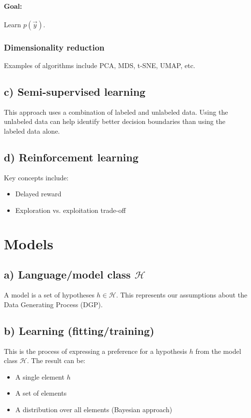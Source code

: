 \documentclass{article}
\begin{document}
\begin{multicols}{2}
\paragraph{Goal:} Learn $p(\vec{y})$.

\subsubsection{Dimensionality reduction}
Examples of algorithms include PCA, MDS, t-SNE, UMAP, etc. 

\subsection{c) Semi-supervised learning}
This approach uses a combination of labeled and unlabeled data.  Using the unlabeled data can help identify better decision boundaries than using the labeled data alone. 

\subsection{d) Reinforcement learning}
Key concepts include: 
\begin{itemize}
    \item Delayed reward 
    \item Exploration vs. exploitation trade-off 
\end{itemize}

\section{Models}

\subsection{a) Language/model class $\mathcal{H}$}
A model is a set of hypotheses $h \in \mathcal{H}$. This represents our assumptions about the Data Generating Process (DGP). 

\subsection{b) Learning (fitting/training)}
This is the process of expressing a preference for a hypothesis $h$ from the model class $\mathcal{H}$. The result can be: 
\begin{itemize}
    \item A single element $h$ 
    \item A set of elements 
    \item A distribution over all elements (Bayesian approach) 
\end{itemize}


\end{multicols}
\end{document}
